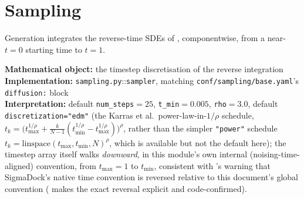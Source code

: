 \documentclass[11pt,a4paper]{report}
\theoremstyle{definition}
\theoremstyle{remark}
\newcommand{\file}[1]{\texttt{#1}}
\newcommand{\pyfunc}[1]{\texttt{#1}}
\begin{document}
\section{Sampling}
\label{sec:sigmadock-sampling}

Generation integrates the reverse-time SDEs of
, componentwise, from a
near-$t=0$ starting time to $t=1$.

\begin{codebox}
\textbf{Mathematical object:} the timestep discretisation of the reverse
integration \\
\textbf{Implementation:} \file{sampling.py}::\pyfunc{sampler}, matching
\file{conf/sampling/base.yaml}'s \texttt{diffusion:} block \\
\textbf{Interpretation:} default \texttt{num\_steps}$=25$,
\texttt{t\_min}$=0.005$, \texttt{rho}$=3.0$, default
\texttt{discretization="edm"} (the Karras et al.\ power-law-in-$1/\rho$
schedule, $t_k=\bigl(t_{\max}^{1/\rho}+\tfrac k{N-1}(t_{\min}^{1/\rho}-t_{\max}^{1/\rho})\bigr)^\rho$,
rather than the simpler \texttt{"power"} schedule
$t_k=\mathrm{linspace}(t_{\max},t_{\min},N)^\rho$, which is available but
not the default here); the timestep array itself walks \emph{downward}, in
this module's own internal (noising-time-aligned) convention, from
$t_{\max}=1$ to $t_{\min}$, consistent with 's
warning that SigmaDock's native time convention is reversed relative to
this document's global convention ( makes the exact
reversal explicit and code-confirmed).
\end{codebox}
\end{document}
